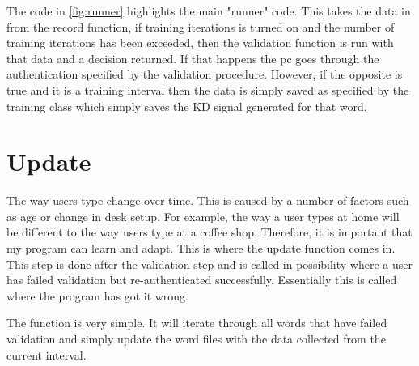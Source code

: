 \documentclass[10pt,a4paper]{report}
\begin{document}
The code in \ref{fig:runner} highlights the main "runner" code. This takes the data in from the record function, if training iterations is turned on and the number of training iterations has been exceeded, then the validation function is run with that data and a decision returned. If that happens the pc goes through the authentication specified by the validation procedure. However, if the opposite is true and it is a training interval then the data is simply saved as specified by the training class which simply saves the KD signal generated for that word.

\section{Update}
\label{sssec:update}

The way users type change over time. This is caused by a number of factors such as age or change in desk setup. For example, the way a user types at home will be different to the way users type at a coffee shop. Therefore, it is important that my program can learn and adapt. This is where the update function comes in. This step is done after the validation step and is called in possibility where a user has failed validation but re-authenticated successfully. Essentially this is called where the program has got it wrong. 

The function is very simple. It will iterate through all words that have failed validation and simply update the word files with the data collected from the current interval.
\end{document}
